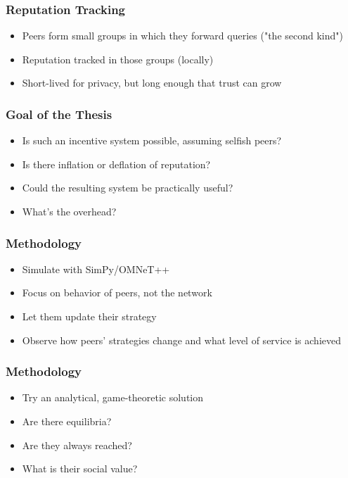 \documentclass{beamer}
\begin{document}
\begin{frame}
  \frametitle{Reputation Tracking}
  \begin{itemize}
    \item Peers form small groups in which they forward queries ("the second
          kind")
    \item Reputation tracked in those groups (locally)
    \item Short-lived for privacy, but long enough that trust can grow
  \end{itemize}
\end{frame}

\begin{frame}
  \frametitle{Goal of the Thesis}
  \begin{itemize}
    \item Is such an incentive system possible, assuming selfish peers?
    \item Is there inflation or deflation of reputation?
    \item Could the resulting system be practically useful?
    \item What's the overhead?
  \end{itemize}
\end{frame}

\begin{frame}
  \frametitle{Methodology}
  \begin{itemize}
    \item Simulate with SimPy/OMNeT++
    \item Focus on behavior of peers, not the network
    \item Let them update their strategy
    \item Observe how peers' strategies change and what level of service is
          achieved
  \end{itemize}
\end{frame}

\begin{frame}
  \frametitle{Methodology}
  \begin{itemize}
    \item Try an analytical, game-theoretic solution
    \item Are there equilibria?
    \item Are they always reached?
    \item What is their social value?
  \end{itemize}
\end{frame}
\end{document}
